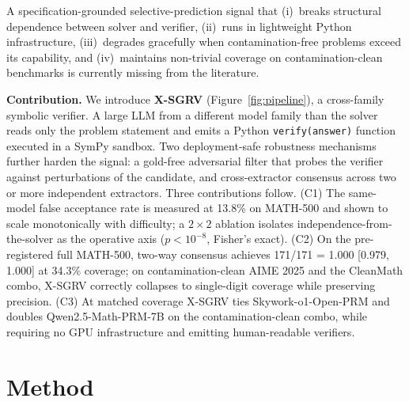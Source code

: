 \documentclass{article}
\begin{document}
A specification-grounded selective-prediction signal that (i)~breaks structural dependence between solver and verifier, (ii)~runs in lightweight Python infrastructure, (iii)~degrades gracefully when contamination-free problems exceed its capability, and (iv)~maintains non-trivial coverage on contamination-clean benchmarks is currently missing from the literature.

\textbf{Contribution.} We introduce \textbf{X-SGRV} (Figure~\ref{fig:pipeline}), a cross-family symbolic verifier. A large LLM from a different model family than the solver reads only the problem statement and emits a Python \texttt{verify(answer)} function executed in a SymPy sandbox. Two deployment-safe robustness mechanisms further harden the signal: a gold-free adversarial filter that probes the verifier against perturbations of the candidate, and cross-extractor consensus across two or more independent extractors. Three contributions follow. (C1) The same-model false acceptance rate is measured at 13.8\% on MATH-500 and shown to scale monotonically with difficulty; a $2{\times}2$ ablation isolates independence-from-the-solver as the operative axis ($p<10^{-8}$, Fisher's exact). (C2) On the pre-registered full MATH-500, two-way consensus achieves 171/171 = 1.000 [0.979, 1.000] at 34.3\% coverage; on contamination-clean AIME 2025 and the CleanMath combo, X-SGRV correctly collapses to single-digit coverage while preserving precision. (C3) At matched coverage X-SGRV ties Skywork-o1-Open-PRM and doubles Qwen2.5-Math-PRM-7B on the contamination-clean combo, while requiring no GPU infrastructure and emitting human-readable verifiers.

\section{Method}
\end{document}
